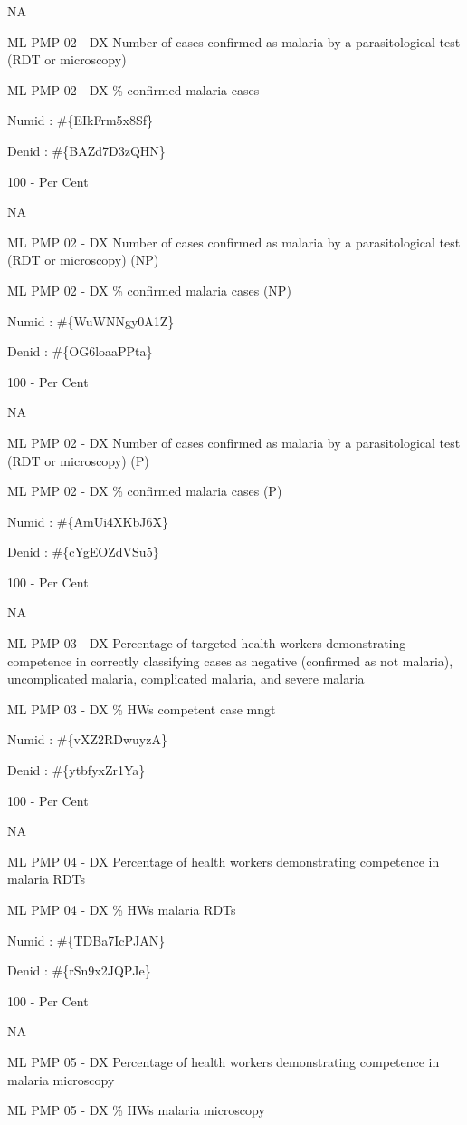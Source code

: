 \documentclass[]{book}
\begin{document}
NA

ML PMP 02 - DX Number of cases confirmed as malaria by a parasitological test (RDT or microscopy)

ML PMP 02 - DX \% confirmed malaria cases

Numid : \#\{EIkFrm5x8Sf\}

Denid : \#\{BAZd7D3zQHN\}

100 - Per Cent

NA

ML PMP 02 - DX Number of cases confirmed as malaria by a parasitological test (RDT or microscopy) (NP)

ML PMP 02 - DX \% confirmed malaria cases (NP)

Numid : \#\{WuWNNgy0A1Z\}

Denid : \#\{OG6loaaPPta\}

100 - Per Cent

NA

ML PMP 02 - DX Number of cases confirmed as malaria by a parasitological test (RDT or microscopy) (P)

ML PMP 02 - DX \% confirmed malaria cases (P)

Numid : \#\{AmUi4XKbJ6X\}

Denid : \#\{cYgEOZdVSu5\}

100 - Per Cent

NA

ML PMP 03 - DX Percentage of targeted health workers demonstrating competence in correctly classifying cases as negative (confirmed as not malaria), uncomplicated malaria, complicated malaria, and severe malaria

ML PMP 03 - DX \% HWs competent case mngt

Numid : \#\{vXZ2RDwuyzA\}

Denid : \#\{ytbfyxZr1Ya\}

100 - Per Cent

NA

ML PMP 04 - DX Percentage of health workers demonstrating competence in malaria RDTs

ML PMP 04 - DX \% HWs malaria RDTs

Numid : \#\{TDBa7IcPJAN\}

Denid : \#\{rSn9x2JQPJe\}

100 - Per Cent

NA

ML PMP 05 - DX Percentage of health workers demonstrating competence in malaria microscopy

ML PMP 05 - DX \% HWs malaria microscopy
\end{document}
